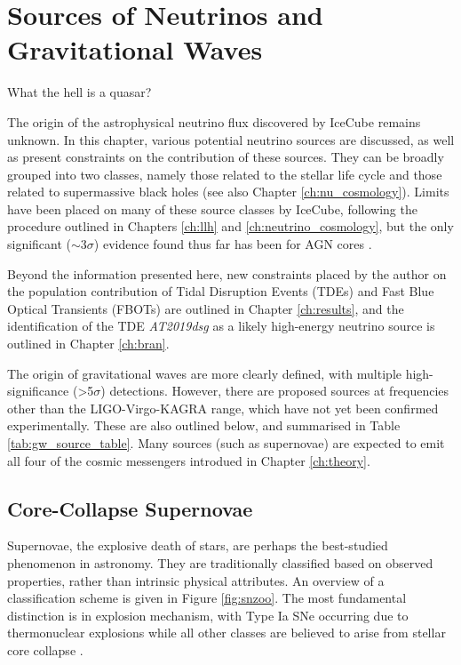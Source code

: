 \setchapterpreamble[u]{\margintoc}
\chapter{Sources of Neutrinos and Gravitational Waves}

\begin{fquote} What the hell is a quasar?
\end{fquote}


The origin of the astrophysical neutrino flux discovered by IceCube remains unknown. In this chapter, various potential neutrino sources are discussed, as well as present constraints on the contribution of these sources. They can be broadly grouped into two classes, namely those related to the stellar life cycle and those related to supermassive black holes (see also Chapter \ref{ch:nu_cosmology}). Limits have been placed on many of these source classes by IceCube, following the procedure outlined in Chapters \ref{ch:llh} and \ref{ch:neutrino_cosmology}, but the only significant ($\sim$3$\sigma$) evidence found thus far has been for AGN cores .

Beyond the information presented here, new constraints placed by the author on the population contribution of Tidal Disruption Events (TDEs) and Fast Blue Optical Transients (FBOTs) are outlined in Chapter \ref{ch:results}, and the identification of the TDE \emph{AT2019dsg} as a likely high-energy neutrino source is outlined in Chapter \ref{ch:bran}.  

The origin of gravitational waves are more clearly defined, with multiple high-significance (>5$\sigma$) detections. However, there are proposed sources at frequencies other than the LIGO-Virgo-KAGRA range, which have not yet been confirmed experimentally. These are also outlined below, and summarised in Table \ref{tab:gw_source_table}. Many sources (such as supernovae) are expected to emit all four of the cosmic messengers introdued in Chapter \ref{ch:theory}.

\section{Core-Collapse Supernovae}
\label{sec:ccsn}

Supernovae, the explosive death of stars, are perhaps the best-studied phenomenon in astronomy. They are traditionally classified based on observed properties, rather than intrinsic physical attributes. An overview of a classification scheme is given in Figure \ref{fig:snzoo}. The most fundamental distinction is in explosion mechanism, with Type Ia SNe occurring due to thermonuclear explosions while all other classes are believed to arise from stellar core collapse . 

